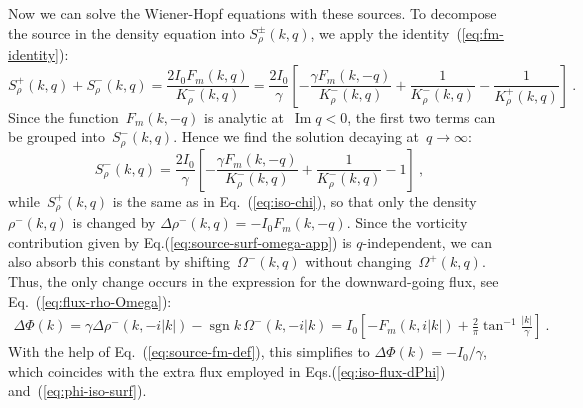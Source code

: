 \documentclass[preprint,aps,eqsecnum, prb]{revtex4-1}
\newcommand{\fplus}[1]{{#1}^{+}}
\newcommand{\fminus}[1]{{#1}^{-}}
\newcommand{\fplusminus}[1]{{#1}^{\pm}}
\renewcommand{\Im}{\mathop{\mathrm{Im}}\nolimits}
\newcommand{\sgn}{\mathop{\mathrm{sgn}}\nolimits}
\begin{document}
Now we can solve the Wiener-Hopf equations with these sources.
To decompose the source in the density equation
into  $\fplusminus{S}_\rho(k, q)$, we
apply the identity~(\ref{eq:fm-identity}):
\begin{equation}
  \fplus{S}_\rho(k,q) + \fminus{S}_\rho(k, q)
  = \frac{2 I_0 F_m(k, q)}{\fminus{K}_\rho(k, q)}
= \frac{2I_0}{\gamma}
\left[ -  \frac{\gamma F_m(k, -q)}{\fminus{K}_\rho(k, q)}
+ \frac{1}{\fminus{K}_\rho(k, q)}  -  \frac{1}{\fplus{K}_\rho(k, q)}\right]
\  .
\end{equation}
Since the function~$F_m(k, -q)$ is analytic at~$\Im q < 0$,
the first two terms can be grouped into~$\fminus{S}_\rho(k, q)$.
Hence we find the solution decaying at~$q\to \infty$:
\begin{equation}
\fminus{S}_\rho(k, q) = \frac{2I_0}{\gamma}
\left[ - \frac{\gamma F_m(k, -q)}{\fminus{K}_\rho(k, q)}
       + \frac{1}{\fminus{K}_\rho(k, q)} - 1
\right]
\ ,
\end{equation}
while~$\fplus{S}_\rho(k, q)$ is the same as in Eq.~(\ref{eq:iso-chi}),
so that only the density~$\fminus{\rho}(k, q)$ is changed by
$\Delta\fminus{\rho}(k, q) = - I_0 F_m(k, -q)$.
Since the vorticity contribution given by Eq.(\ref{eq:source-surf-omega-app})
is $q$-independent, we can also absorb this constant by
shifting~$\fminus{\Omega}(k, q)$ without changing~$\fplus{\Omega}(k, q)$.
Thus, the only change occurs in the expression for the downward-going
flux, see Eq.~(\ref{eq:flux-rho-Omega}):
\begin{align}
\Delta \Phi(k) = \gamma \Delta \fminus{\rho}(k, -i|k|) -
\sgn k\, \fminus{\Omega}(k, -i|k)
= I_0 \left[-F_m(k, i|k|) + \frac{2}{\pi} \tan^{-1}\frac{|k|}{\gamma}\right]
\ .
\end{align}
With the help of Eq.~(\ref{eq:source-fm-def}), this simplifies to
$\Delta \Phi(k) = -I_0 / \gamma$, which coincides with the extra flux
employed in Eqs.(\ref{eq:iso-flux-dPhi}) and~(\ref{eq:phi-iso-surf}).
\end{document}

